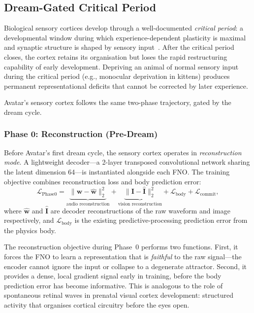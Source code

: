 \subsection{Dream-Gated Critical Period}
\label{sec:critical_period}

Biological sensory cortices develop through a well-documented \emph{critical period}:
a developmental window during which experience-dependent plasticity is maximal and
synaptic structure is shaped by sensory input~\cite{hubel1970}.
After the critical period closes, the cortex retains its organisation but loses the
rapid restructuring capability of early development.
Depriving an animal of normal sensory input during the critical period (e.g., monocular
deprivation in kittens) produces permanent representational deficits that cannot be
corrected by later experience.

Avatar's sensory cortex follows the same two-phase trajectory, gated by the dream
cycle.

\subsubsection{Phase 0: Reconstruction (Pre-Dream)}
\label{sec:phase0}

Before Avatar's first dream cycle, the sensory cortex operates in \emph{reconstruction
mode}.
A lightweight decoder---a 2-layer transposed convolutional network sharing the latent
dimension 64---is instantiated alongside each FNO.
The training objective combines reconstruction loss and body prediction error:
\begin{equation}
\mathcal{L}_{\mathrm{Phase0}} =
    \underbrace{\| \mathbf{w} - \hat{\mathbf{w}} \|_2^2}_{\text{audio reconstruction}}
    + \underbrace{\| \mathbf{I} - \hat{\mathbf{I}} \|_2^2}_{\text{vision reconstruction}}
    + \mathcal{L}_{\mathrm{body}}
    + \mathcal{L}_{\mathrm{commit}},
\label{eq:phase0_loss}
\end{equation}
where $\hat{\mathbf{w}}$ and $\hat{\mathbf{I}}$ are decoder reconstructions of the
raw waveform and image respectively, and $\mathcal{L}_{\mathrm{body}}$ is the
existing predictive-processing prediction error from the physics body.

The reconstruction objective during Phase~0 performs two functions.
First, it forces the FNO to learn a representation that is \emph{faithful} to the raw
signal---the encoder cannot ignore the input or collapse to a degenerate attractor.
Second, it provides a dense, local gradient signal early in training, before the body
prediction error has become informative.
This is analogous to the role of spontaneous retinal waves in prenatal visual cortex
development: structured activity that organises cortical circuitry before the eyes open.

